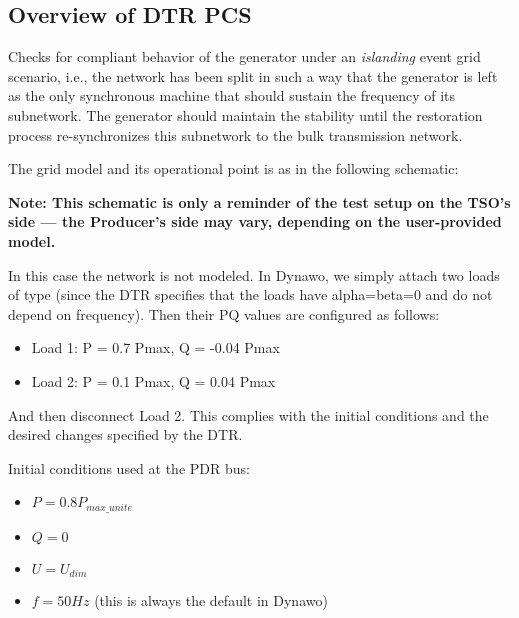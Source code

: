     \subsection{Overview of DTR PCS \DTRPcs}

    Checks for compliant behavior of the generator under an
    \emph{islanding} event grid scenario, i.e., the network has been split in
    such a way that the generator is left as the only synchronous machine
    that should sustain the frequency of its subnetwork. The generator
    should maintain the stability until the restoration process
    re-synchronizes this subnetwork to the bulk transmission network.

    The grid model and its operational point is as in the following schematic:
    \begin{center}
        
    \end{center}
    \begin{center}
        \small \textbf{Note: This schematic is only a reminder of the test setup on the TSO's
        side --- the Producer's side may vary, depending on the user-provided model.}
    \end{center}

    In this case the network is not modeled. In Dynawo, we simply attach
    two loads of type  (since the DTR specifies that the
    loads have alpha=beta=0 and do not depend on frequency). Then their
    PQ values are configured as follows:
    \begin{itemize}
        \item Load 1: P = 0.7 Pmax, Q = -0.04 Pmax
        \item Load 2: P = 0.1 Pmax, Q = 0.04 Pmax
    \end{itemize}
    And then disconnect Load 2. This complies with the initial conditions
    and the desired changes specified by the DTR.

    \begin{description}
        \item Initial conditions used at the PDR bus:
        \begin{itemize}
            \item $P = 0.8 P_{max\_unite}$
            \item $Q = 0$
            \item $U = U_{dim}$
            \item $f = 50 Hz$ (this is always the default in Dynawo)
        \end{itemize}
    \end{description}

